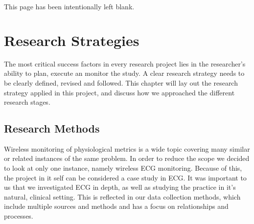 \newpage
\thispagestyle{empty}
This page has been intentionally left blank.

\newpage


\section{Research Strategies} %
\label{sec:method}

The most critical success factors in every research project lies in the researcher's ability to plan, execute an monitor the study. A clear research strategy needs to be clearly defined, revised and followed. This chapter will lay out the research strategy applied in this project, and discuss how we approached the different research stages.

\subsection{Research Methods} %
\label{sub:research_methods}

Wireless monitoring of physiological metrics is a wide topic covering many similar or related instances of the same problem. In order to reduce the scope we decided to look at only one instance, namely wireless ECG monitoring. Because of this, the project in it self can be considered a case study in ECG. It was important to us that we investigated ECG in depth, as well as studying the practice in it's natural, clinical setting. This is reflected in our data collection methods, which include multiple sources and methods and has a focus on relationships and processes.

